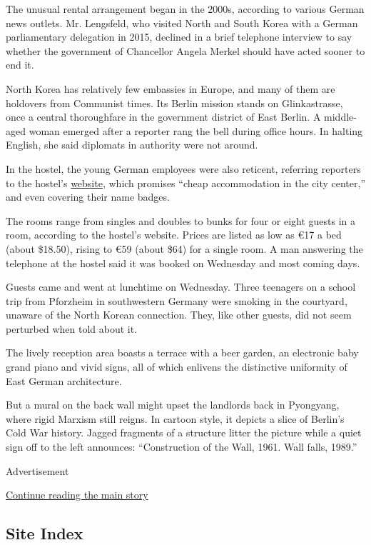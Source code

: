The unusual rental arrangement began in the 2000s, according to various
German news outlets. Mr. Lengsfeld, who visited North and South Korea
with a German parliamentary delegation in 2015, declined in a brief
telephone interview to say whether the government of Chancellor Angela
Merkel should have acted sooner to end it.

North Korea has relatively few embassies in Europe, and many of them are
holdovers from Communist times. Its Berlin mission stands on
Glinkastrasse, once a central thoroughfare in the government district of
East Berlin. A middle-aged woman emerged after a reporter rang the bell
during office hours. In halting English, she said diplomats in authority
were not around.

In the hostel, the young German employees were also reticent, referring
reporters to the hostel's
\href{http://www.cityhostel-berlin.com/gb/}{website}, which promises
``cheap accommodation in the city center,'' and even covering their name
badges.

The rooms range from singles and doubles to bunks for four or eight
guests in a room, according to the hostel's website. Prices are listed
as low as €17 a bed (about \$18.50), rising to €59 (about \$64) for a
single room. A man answering the telephone at the hostel said it was
booked on Wednesday and most coming days.

Guests came and went at lunchtime on Wednesday. Three teenagers on a
school trip from Pforzheim in southwestern Germany were smoking in the
courtyard, unaware of the North Korean connection. They, like other
guests, did not seem perturbed when told about it.

The lively reception area boasts a terrace with a beer garden, an
electronic baby grand piano and vivid signs, all of which enlivens the
distinctive uniformity of East German architecture.

But a mural on the back wall might upset the landlords back in
Pyongyang, where rigid Marxism still reigns. In cartoon style, it
depicts a slice of Berlin's Cold War history. Jagged fragments of a
structure litter the picture while a quiet sign off to the left
announces: ``Construction of the Wall, 1961. Wall falls, 1989.''

Advertisement

\protect\hyperlink{after-bottom}{Continue reading the main story}

\hypertarget{site-index}{%
\subsection{Site Index}\label{site-index}}

